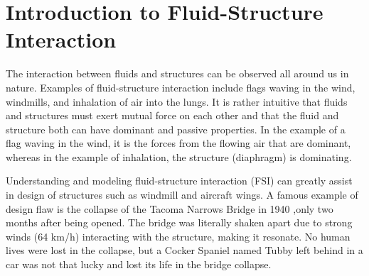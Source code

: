 \chapter{Introduction to Fluid-Structure Interaction}
The interaction between fluids and structures can be observed all around us in nature.
Examples of fluid-structure interaction include flags waving in the wind, windmills, and inhalation of air into the lungs. It is rather intuitive that fluids and structures must exert mutual force on each other and that the fluid and structure both can have dominant and passive properties. In the example of a flag waving in the wind, it is the forces from the flowing air that are dominant, whereas in the example of inhalation, the structure (diaphragm) is dominating. 

Understanding and modeling fluid-structure interaction (FSI) can greatly assist in design of structures such as windmill and aircraft wings. A famous example of design flaw is the collapse of the Tacoma Narrows Bridge in 1940 \cite{Billah1991},only two months after being opened. The bridge was literally shaken apart due to strong winds (64 km/h) interacting with the structure, making it resonate. No human lives were lost in the collapse, but a Cocker Spaniel named Tubby left behind in a car was not that lucky and lost its life in the bridge collapse. \newline

